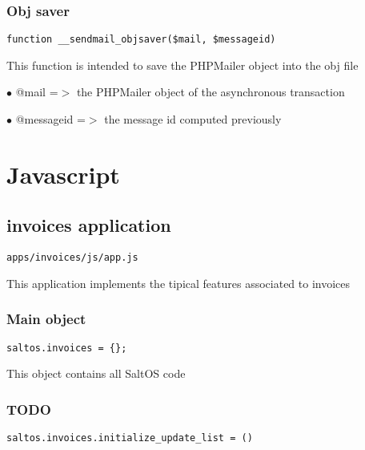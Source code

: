 \documentclass[a4paper]{book}
\begin{document}
\hypertarget{toc71}{}
\subsection{Obj saver}

\begin{lstlisting}
function __sendmail_objsaver($mail, $messageid)
\end{lstlisting}

This function is intended to save the PHPMailer object into the obj file

\begin{compactitem}
\item[\color{myblue}$\bullet$] @mail      =$>$ the PHPMailer object of the asynchronous transaction
\item[\color{myblue}$\bullet$] @messageid =$>$ the message id computed previously
\end{compactitem}


\hypertarget{toc72}{}
\chapter{Javascript}

\hypertarget{toc73}{}
\section{invoices application}

\begin{lstlisting}
apps/invoices/js/app.js
\end{lstlisting}

This application implements the tipical features associated to invoices

\hypertarget{toc74}{}
\subsection{Main object}

\begin{lstlisting}
saltos.invoices = {};
\end{lstlisting}

This object contains all SaltOS code

\hypertarget{toc75}{}
\subsection{TODO}

\begin{lstlisting}
saltos.invoices.initialize_update_list = ()
\end{lstlisting}
\end{document}
